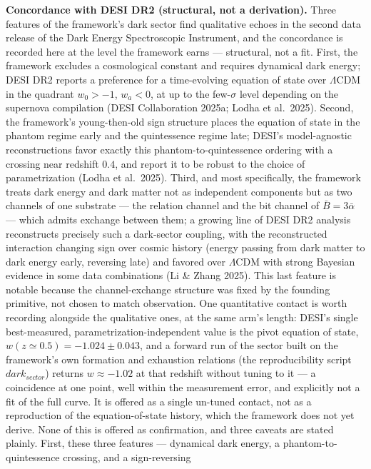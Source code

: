 \documentclass[11pt,oneside]{report}
\theoremstyle{definition}
\theoremstyle{remark}
\begin{document}
\textbf{Concordance with DESI DR2 (structural, not a derivation).} Three features
of the framework's dark sector find qualitative echoes in the second data release
of the Dark Energy Spectroscopic Instrument, and the concordance is recorded here
at the level the framework earns --- structural, not a fit. First, the framework
excludes a cosmological constant and requires dynamical dark energy; DESI DR2
reports a preference for a time-evolving equation of state over $\Lambda$CDM in the
quadrant $w_0 > -1$, $w_a < 0$, at up to the few-$\sigma$ level depending on the
supernova compilation (DESI Collaboration 2025a; Lodha et al.\ 2025). Second, the
framework's young-then-old sign structure places the equation of state in the
phantom regime early and the quintessence regime late; DESI's model-agnostic
reconstructions favor exactly this phantom-to-quintessence ordering with a crossing
near redshift $0.4$, and report it to be robust to the choice of parametrization
(Lodha et al.\ 2025). Third, and most specifically, the framework treats dark
energy and dark matter not as independent components but as two channels of one
substrate --- the relation channel and the bit channel of $\bar{B}=3\bar{\alpha}$
--- which admits exchange between them; a growing line of DESI DR2 analysis
reconstructs precisely such a dark-sector coupling, with the reconstructed
interaction changing sign over cosmic history (energy passing from dark matter to
dark energy early, reversing late) and favored over $\Lambda$CDM with strong
Bayesian evidence in some data combinations (Li \& Zhang 2025). This last feature
is notable because the channel-exchange structure was fixed by the founding
primitive, not chosen to match observation. One quantitative contact is worth
recording alongside the qualitative ones, at the same arm's length: DESI's
single best-measured, parametrization-independent value is the pivot equation of
state, \ensuremath{w(z\simeq0.5) = -1.024 \pm 0.043}, and a forward run of the sector built on
the framework's own formation and exhaustion relations (the reproducibility script
\ensuremath{dark_{sector}}) returns \ensuremath{w \approx -1.02} at that redshift without tuning to it ---
a coincidence at one point, well within the measurement error, and explicitly not a
fit of the full curve. It is offered as a single un-tuned contact, not as a
reproduction of the equation-of-state history, which the framework does not yet
derive. None of this is offered as confirmation, and three caveats are stated
plainly. First, these three features ---
dynamical dark energy, a phantom-to-quintessence crossing, and a sign-reversing
\end{document}
